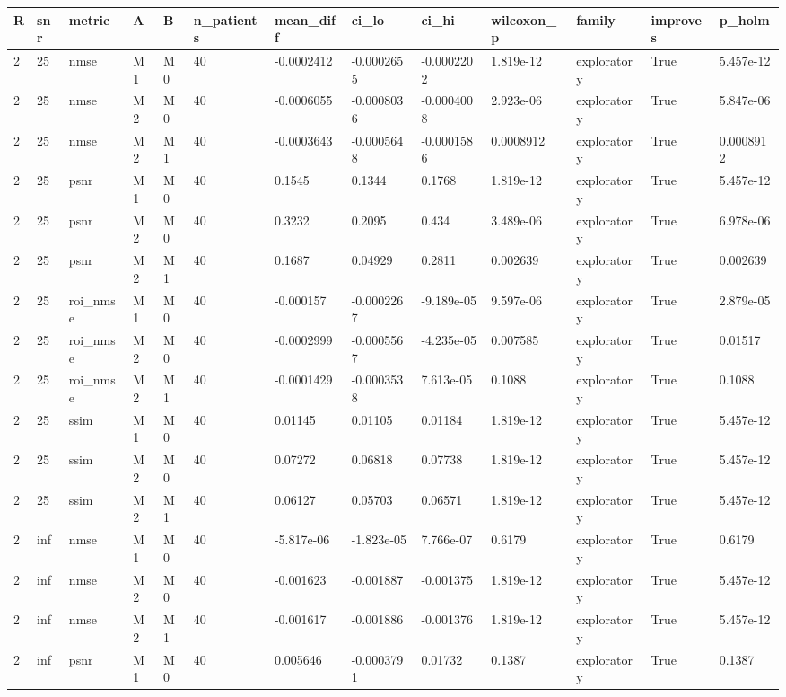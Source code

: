 \begin{tabular}{lllllllllllll}
\hline
R & snr & metric & A & B & n\_patients & mean\_diff & ci\_lo & ci\_hi & wilcoxon\_p & family & improves & p\_holm \\
\hline
2 & 25 & nmse & M1 & M0 & 40 & -0.0002412 & -0.0002655 & -0.0002202 & 1.819e-12 & exploratory & True & 5.457e-12 \\
2 & 25 & nmse & M2 & M0 & 40 & -0.0006055 & -0.0008036 & -0.0004008 & 2.923e-06 & exploratory & True & 5.847e-06 \\
2 & 25 & nmse & M2 & M1 & 40 & -0.0003643 & -0.0005648 & -0.0001586 & 0.0008912 & exploratory & True & 0.0008912 \\
2 & 25 & psnr & M1 & M0 & 40 & 0.1545 & 0.1344 & 0.1768 & 1.819e-12 & exploratory & True & 5.457e-12 \\
2 & 25 & psnr & M2 & M0 & 40 & 0.3232 & 0.2095 & 0.434 & 3.489e-06 & exploratory & True & 6.978e-06 \\
2 & 25 & psnr & M2 & M1 & 40 & 0.1687 & 0.04929 & 0.2811 & 0.002639 & exploratory & True & 0.002639 \\
2 & 25 & roi\_nmse & M1 & M0 & 40 & -0.000157 & -0.0002267 & -9.189e-05 & 9.597e-06 & exploratory & True & 2.879e-05 \\
2 & 25 & roi\_nmse & M2 & M0 & 40 & -0.0002999 & -0.0005567 & -4.235e-05 & 0.007585 & exploratory & True & 0.01517 \\
2 & 25 & roi\_nmse & M2 & M1 & 40 & -0.0001429 & -0.0003538 & 7.613e-05 & 0.1088 & exploratory & True & 0.1088 \\
2 & 25 & ssim & M1 & M0 & 40 & 0.01145 & 0.01105 & 0.01184 & 1.819e-12 & exploratory & True & 5.457e-12 \\
2 & 25 & ssim & M2 & M0 & 40 & 0.07272 & 0.06818 & 0.07738 & 1.819e-12 & exploratory & True & 5.457e-12 \\
2 & 25 & ssim & M2 & M1 & 40 & 0.06127 & 0.05703 & 0.06571 & 1.819e-12 & exploratory & True & 5.457e-12 \\
2 & inf & nmse & M1 & M0 & 40 & -5.817e-06 & -1.823e-05 & 7.766e-07 & 0.6179 & exploratory & True & 0.6179 \\
2 & inf & nmse & M2 & M0 & 40 & -0.001623 & -0.001887 & -0.001375 & 1.819e-12 & exploratory & True & 5.457e-12 \\
2 & inf & nmse & M2 & M1 & 40 & -0.001617 & -0.001886 & -0.001376 & 1.819e-12 & exploratory & True & 5.457e-12 \\
2 & inf & psnr & M1 & M0 & 40 & 0.005646 & -0.0003791 & 0.01732 & 0.1387 & exploratory & True & 0.1387 \\

\end{tabular}

